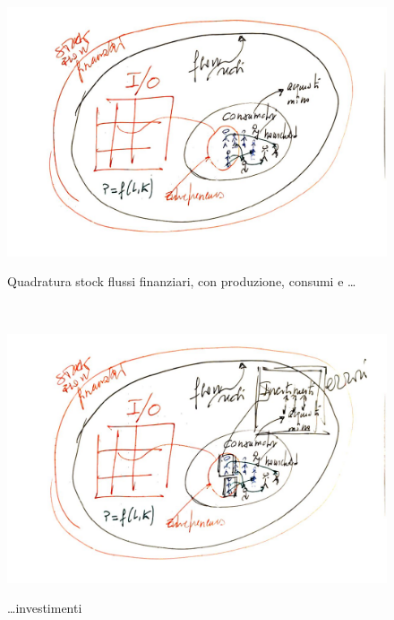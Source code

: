 \documentclass[]{beamer}
\begin{document}
\begin{frame}{~} %



\begin{figure}[H]
\center
\includegraphics[scale=0.50]{3.pdf}
\label{3}
\caption{Quadratura stock flussi finanziari, con produzione, consumi e \ldots}
\end{figure}

\end{frame}

\begin{frame}{~} %



\begin{figure}[H]
\center
\includegraphics[scale=0.50]{4.pdf}
\label{4}
\caption{\ldots investimenti}
\end{figure}

\end{frame}
\end{document}

